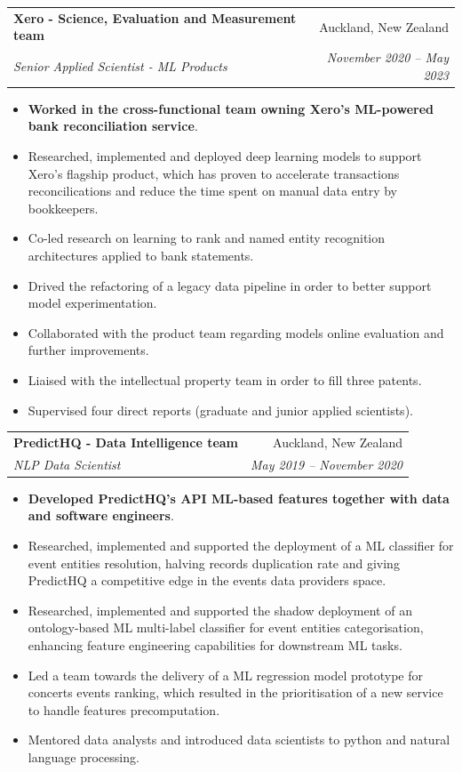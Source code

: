 \documentclass[letterpaper,11pt]{article}
\makeatletter
\newcommand{\resumeItemBis}[2]{
  \item\small{
    \textbf{#1}{#2 \vspace{-2pt}}
  }
}
\newcommand{\resumeSubheading}[4]{
  \vspace{-1pt}\item
    \begin{tabular*}{0.97\textwidth}[t]{l@{\extracolsep{\fill}}r}
      \textbf{#1} & #2 \\
      \textit{\small#3} & \textit{\small #4} \\
    \end{tabular*}\vspace{-5pt}
}
\newcommand{\resumeItemListStart}{\begin{itemize}}
\newcommand{\resumeItemListEnd}{\end{itemize}\vspace{-5pt}}
\makeatother
\begin{document}
	\resumeSubheading
      {Xero - Science, Evaluation and Measurement team}{Auckland, New Zealand}
      {Senior Applied Scientist - ML Products}{November 2020 -- May 2023}
      \resumeItemListStart
        \resumeItemBis{Worked in the cross-functional team owning Xero's ML-powered bank reconciliation service}{.}
        \resumeItemBis{} {Researched, implemented and deployed deep learning models to support Xero's flagship product, which has proven to accelerate transactions reconcilications and reduce the time spent on manual data entry by bookkeepers.}
        \resumeItemBis{} {Co-led research on learning to rank and named entity recognition architectures applied to bank statements.}
        \resumeItemBis{} {Drived the refactoring of a legacy data pipeline in order to better support model experimentation.}
        \resumeItemBis{} {Collaborated with the product team regarding models online evaluation and further improvements.}
        \resumeItemBis{} {Liaised with the intellectual property team in order to fill three patents.}
        \resumeItemBis{} {Supervised four direct reports (graduate and junior applied scientists).}
      \resumeItemListEnd

	\resumeSubheading
      {PredictHQ - Data Intelligence team}{Auckland, New Zealand}
      {NLP Data Scientist}{May 2019 -- November 2020}
      \resumeItemListStart
        \resumeItemBis{Developed PredictHQ's API ML-based features together with data and software engineers}{.}
          \resumeItemBis{} {Researched, implemented and supported the deployment of a ML classifier for event entities resolution, halving records duplication rate and giving PredictHQ a competitive edge in the events data providers space.}
          \resumeItemBis{} {Researched, implemented and supported the shadow deployment of an ontology-based ML multi-label classifier for event entities categorisation, enhancing feature engineering capabilities for downstream ML tasks.}
          \resumeItemBis{} {Led a team towards the delivery of a ML regression model prototype for concerts events ranking, which resulted in the prioritisation of a new service to handle features precomputation.}
          \resumeItemBis{} {Mentored data analysts and introduced data scientists to python and natural language processing.}
        \resumeItemListEnd	
	
\end{document}
